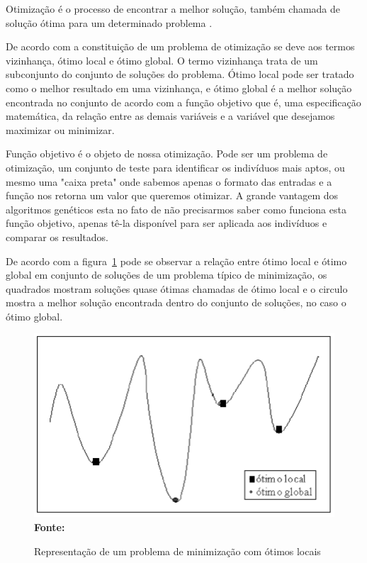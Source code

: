 \documentclass{abntpuc}
\begin{document}
%

%



Otimização é o processo de encontrar a melhor solução, também chamada de solução ótima para um determinado problema \cite{timoteo2005desenvolvimento}.\par

De acordo com \cite{steiglitz1982combinatorial} a constituição de um problema de otimização se deve aos termos vizinhança, ótimo local e ótimo global. O termo vizinhança trata de um subconjunto do conjunto de soluções do problema. Ótimo local pode ser tratado como o melhor resultado em uma vizinhança, e ótimo global é a melhor solução encontrada no conjunto de acordo com a função objetivo que é, uma especificação matemática, da relação entre as demais variáveis e a variável que desejamos maximizar ou minimizar.\par

Função objetivo é o objeto de nossa otimização. Pode ser um problema de otimização, um conjunto de teste para identificar os indivíduos mais aptos, ou mesmo uma "caixa preta" onde sabemos apenas o formato das entradas e a função nos retorna um valor que queremos otimizar. A grande vantagem dos algoritmos genéticos esta no fato de não precisarmos saber como funciona esta função objetivo, apenas tê-la disponível para ser aplicada aos indivíduos e comparar os resultados.

De acordo com a figura~\ref{fig:representacaoLocal}  pode se observar a relação entre ótimo local e ótimo global em conjunto de soluções de um problema típico de minimização, os quadrados mostram soluções quase ótimas chamadas de ótimo local e o circulo mostra a melhor solução encontrada dentro do conjunto de soluções, no caso o ótimo global.\par

\begin{figure}[!htb]
\caption[Representação de um problema de minimização com ótimos locais]{Representação de um problema de minimização com ótimos locais}
\label{fig:representacaoLocal}
\centering
\includegraphics[scale=0.55]{imagens/problemaOtimizacao.png}
\\ \textbf{\footnotesize Fonte: \cite{timoteo2005desenvolvimento}}
\end{figure}
	
\end{document}
